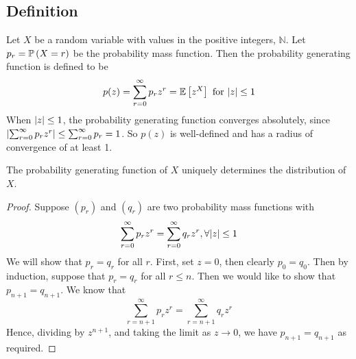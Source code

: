 \subsection{Definition}
Let $X$ be a random variable with values in the positive integers, $\mathbb N$. Let $p_r = \mathbb{P}\left({X = r}\right)$ be the probability mass function. Then the probability generating function is defined to be
\[ p(z) = \sum_{r=0}^\infty p_r z^r = \mathbb{E}\left[{z^X}\right] \text{ for } \abs{z} \leq 1 \]
When $\abs{z} \leq 1$, the probability generating function converges absolutely, since $\abs{\sum_{r=0}^\infty p_r z^r} \leq \sum_{r=0}^\infty p_r = 1$. So $p(z)$ is well-defined and has a radius of convergence of at least 1.
\begin{theorem}
	The probability generating function of $X$ uniquely determines the distribution of $X$.
\end{theorem}
\begin{proof}
	Suppose $(p_r)$ and $(q_r)$ are two probability mass functions with
	\[ \sum_{r=0}^\infty p_r z^r = \sum_{r=0}^\infty q_r z^r, \forall \abs{z} \leq 1 \]
	We will show that $p_r = q_r$ for all $r$. First, set $z = 0$, then clearly $p_0 = q_0$. Then by induction, suppose that $p_r = q_r$ for all $r \leq n$. Then we would like to show that $p_{n+1} = q_{n+1}$. We know that
	\[ \sum_{r=n+1}^\infty p_r z^r = \sum_{r=n+1}^\infty q_r z^r \]
	Hence, dividing by $z^{n+1}$, and taking the limit as $z \to 0$, we have $p_{n+1} = q_{n+1}$ as required.
\end{proof}

